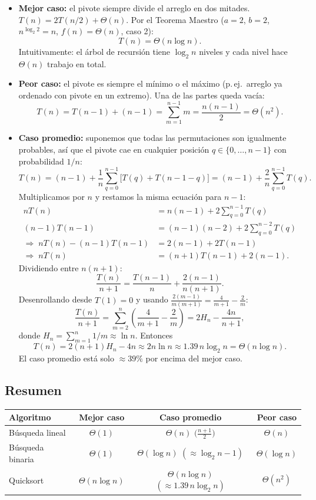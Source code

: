 \documentclass[11pt,letterpaper]{article}
\newcommand{\Th}{\Theta}
\begin{document}
\begin{itemize}
\item \textbf{Mejor caso:} el pivote siempre divide el arreglo en dos mitades. $T(n) = 2T(n/2) + \Th(n)$. Por el Teorema Maestro ($a = 2$, $b = 2$, $n^{\log_2 2} = n$, $f(n) = \Th(n)$, caso 2):
\[
T(n) = \Th(n \log n).
\]
Intuitivamente: el árbol de recursión tiene $\log_2 n$ niveles y cada nivel hace $\Th(n)$ trabajo en total.

\item \textbf{Peor caso:} el pivote es siempre el mínimo o el máximo (p.\,ej.\ arreglo ya ordenado con pivote en un extremo). Una de las partes queda vacía:
\[
T(n) = T(n-1) + (n-1) = \sum_{m=1}^{n-1} m = \frac{n(n-1)}{2} = \Th(n^2).
\]

\item \textbf{Caso promedio:} suponemos que todas las permutaciones son igualmente probables, así que el pivote cae en cualquier posición $q \in \{0,\dots,n-1\}$ con probabilidad $1/n$:
\[
T(n) = (n-1) + \frac1n\sum_{q=0}^{n-1}\big[T(q) + T(n-1-q)\big] = (n-1) + \frac{2}{n}\sum_{q=0}^{n-1} T(q).
\]
Multiplicamos por $n$ y restamos la misma ecuación para $n-1$:
\begin{align*}
nT(n) &= n(n-1) + 2\sum_{q=0}^{n-1} T(q)\\
(n-1)T(n-1) &= (n-1)(n-2) + 2\sum_{q=0}^{n-2} T(q)\\
\Rightarrow\; nT(n) - (n-1)T(n-1) &= 2(n-1) + 2T(n-1)\\
\Rightarrow\; nT(n) &= (n+1)T(n-1) + 2(n-1).
\end{align*}
Dividiendo entre $n(n+1)$:
\[
\frac{T(n)}{n+1} = \frac{T(n-1)}{n} + \frac{2(n-1)}{n(n+1)} .
\]
Desenrollando desde $T(1)=0$ y usando $\frac{2(m-1)}{m(m+1)} = \frac{4}{m+1} - \frac{2}{m}$:
\[
\frac{T(n)}{n+1} = \sum_{m=2}^{n}\left(\frac{4}{m+1}-\frac{2}{m}\right) = 2H_n - \frac{4n}{n+1},
\]
donde $H_n = \sum_{m=1}^n 1/m \approx \ln n$. Entonces
\[
T(n) = 2(n+1)H_n - 4n \approx 2n\ln n \approx 1.39\, n\log_2 n = \Th(n \log n).
\]
El caso promedio está solo $\approx 39\%$ por encima del mejor caso.
\end{itemize}

\subsection*{Resumen}
\begin{center}
\begin{tabular}{lccc}
\toprule
Algoritmo & Mejor caso & Caso promedio & Peor caso \\
\midrule
Búsqueda lineal & $\Th(1)$ & $\Th(n)$ \;\;$\big(\tfrac{n+1}{2}\big)$ & $\Th(n)$ \\
Búsqueda binaria & $\Th(1)$ & $\Th(\log n)$ \;\;$(\approx\log_2 n - 1)$ & $\Th(\log n)$ \\
Quicksort & $\Th(n\log n)$ & $\Th(n\log n)$ \;\;$(\approx 1.39\,n\log_2 n)$ & $\Th(n^2)$ \\
\bottomrule
\end{tabular}
\end{center}
\end{document}
